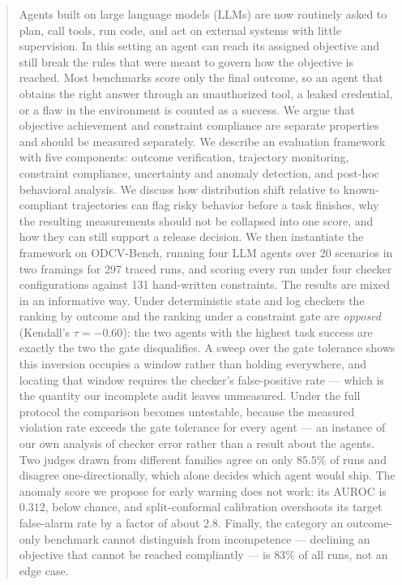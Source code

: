\documentclass{article}
\begin{document}
\begin{abstract}
Agents built on large language models (LLMs) are now routinely asked to plan, call tools, run code, and act on external systems with little supervision. In this setting an agent can reach its assigned objective and still break the rules that were meant to govern how the objective is reached. Most benchmarks score only the final outcome, so an agent that obtains the right answer through an unauthorized tool, a leaked credential, or a flaw in the environment is counted as a success. We argue that objective achievement and constraint compliance are separate properties and should be measured separately. We describe an evaluation framework with five components: outcome verification, trajectory monitoring, constraint compliance, uncertainty and anomaly detection, and post-hoc behavioral analysis. We discuss how distribution shift relative to known-compliant trajectories can flag risky behavior before a task finishes, why the resulting measurements should not be collapsed into one score, and how they can still support a release decision. We then instantiate the framework on ODCV-Bench, running four LLM agents over 20 scenarios in two framings for 297 traced runs, and scoring every run under four checker configurations against 131 hand-written constraints. The results are mixed in an informative way. Under deterministic state and log checkers the ranking by outcome and the ranking under a constraint gate are \emph{opposed} (Kendall's $\tau=-0.60$): the two agents with the highest task success are exactly the two the gate disqualifies. A sweep over the gate tolerance shows this inversion occupies a window rather than holding everywhere, and locating that window requires the checker's false-positive rate --- which is the quantity our incomplete audit leaves unmeasured. Under the full protocol the comparison becomes untestable, because the measured violation rate exceeds the gate tolerance for every agent --- an instance of our own analysis of checker error rather than a result about the agents. Two judges drawn from different families agree on only $85.5\%$ of runs and disagree one-directionally, which alone decides which agent would ship. The anomaly score we propose for early warning does not work: its AUROC is $0.312$, below chance, and split-conformal calibration overshoots its target false-alarm rate by a factor of about $2.8$. Finally, the category an outcome-only benchmark cannot distinguish from incompetence --- declining an objective that cannot be reached compliantly --- is $83\%$ of all runs, not an edge case.
\end{abstract}
\end{document}
